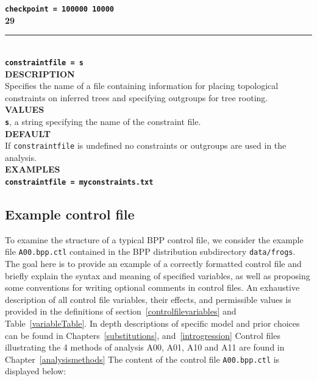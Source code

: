 \documentclass{book}
\numberwithin{equation}{section} \renewcommand{\baselinestretch}{0.55}
\begin{document}
\textbf{\texttt{checkpoint = 100000 10000}} \vspace{10pt}\\
\textbf{{\large 29}} \\
\noindent\rule{\textwidth}{0.8pt} \\
\textbf{{\Large \texttt{constraintfile = s}}} \vspace{5pt}\\
\textbf{DESCRIPTION} \vspace{5pt}\\
Specifies the name of a file containing information for placing
topological constraints on inferred trees and specifying outgroups for
tree rooting.
\vspace{5pt}\\
\textbf{VALUES} \vspace{5pt}\\
\textbf{\texttt{s}}, a string specifying the name of the constraint
file.
\vspace{5pt}\\
\textbf{DEFAULT} \vspace{5pt}\\
If \texttt{constraintfile} is undefined no constraints or outgroups
are used in the analysis.
\vspace{5pt}\\
\textbf{EXAMPLES} \vspace{5pt}\\
\textbf{\texttt{constraintfile = myconstraints.txt}} \vspace{5pt}\\

\subsection{Example control file} \label{examplecontrolfile}
To examine the structure of a typical BPP control file, we consider
the example file \texttt{A00.bpp.ctl} contained in the BPP
distribution subdirectory \texttt{data/frogs}.  The goal here is to
provide an example of a correctly formatted control file and briefly
explain the syntax and meaning of specified variables, as well as
proposing some conventions for writing optional comments in control
files.  An exhaustive description of all control file variables, their
effects, and permissible values is provided in the definitions of
section~\ref{controlfilevariables} and Table~\ref{variableTable}.  In
depth descriptions of specific model and prior choices can be found in
Chapters~\ref{substitutions}, and~\ref{introgression}  Control files illustrating the 4
methods of analysis A00, A01, A10 and A11 are found in
Chapter~\ref{analysismethods} The content of the control file
\texttt{A00.bpp.ctl} is displayed below:
\end{document}
